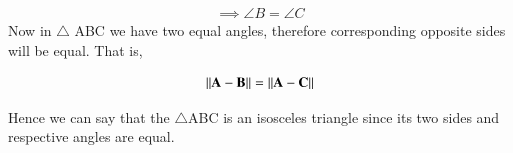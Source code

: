 \documentclass[journal,12pt,twocolumn]{IEEEtran}
\begin{document}
     \begin{align}
  \implies \angle{B}   =  \angle{C} \label{eq2.11}
  \end{align}
  Now in $\triangle$ ABC we have two equal angles, therefore corresponding opposite sides will be equal. That is,
  
   \begin{align}
  \left\lVert\mathbf{A - B}\right\rVert = \left\lVert\mathbf{A - C}\right\rVert \label{eq2.2}
  \end{align}
   
  Hence we can say that the $\triangle$ABC is an isosceles triangle since its two sides and respective angles are equal.
  
  
  
  
  
  
    

  
  
  
  
\end{document}
